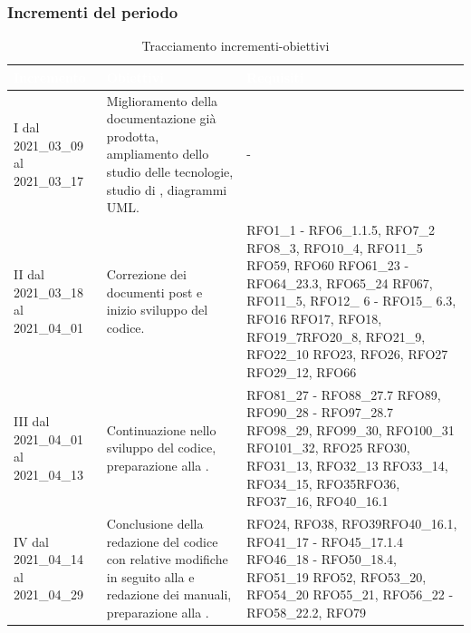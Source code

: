 \subsubsection{Incrementi del periodo}\label{IncrementiPDettaglio}
\begin{table}[H]
	\begin{center}
		\begin{tabular}{ |C{3cm} C{6cm} C{7cm}| }
			\textcolor{white}{\textbf{Incremento}} & \textcolor{white}{\textbf{Obiettivi}} & \textcolor{white}{\textbf{Requisiti}} \\ \hline
			I dal 2021\_03\_09 al 2021\_03\_17& Miglioramento della documentazione già prodotta, ampliamento dello studio delle tecnologie, studio di , diagrammi UML.  & - \\ \hline
			II dal 2021\_03\_18 al 2021\_04\_01 	& Correzione dei documenti post  e inizio sviluppo del codice. &  
			RFO1\_1 - RFO6\_1.1.5, RFO7\_2 \newline
			RFO8\_3, RFO10\_4, RFO11\_5 \newline
			RFO59, RFO60 \newline
			RFO61\_23 - RFO64\_23.3, RFO65\_24 \newline
			RF067,  RFO11\_5, \newline 
			RFO12\_ 6 - RFO15\_ 6.3, RFO16 \newline RFO17, RFO18, RFO19\_7\newline RFO20\_8, RFO21\_9, RFO22\_10 \newline RFO23, RFO26, RFO27 \newline RFO29\_12, RFO66\\ \hline
			III dal 2021\_04\_01 al 2021\_04\_13	& Continuazione nello sviluppo del codice, preparazione alla . & RFO81\_27 - RFO88\_27.7 \newline
			RFO89, RFO90\_28 - RFO97\_28.7 \newline
			RFO98\_29, RFO99\_30, RFO100\_31 \newline
			RFO101\_32, RFO25 \newline RFO30, RFO31\_13, RFO32\_13 \newline RFO33\_14, RFO34\_15, RFO35\newline  RFO36, RFO37\_16, RFO40\_16.1 \\ \hline
			IV dal 2021\_04\_14 al 2021\_04\_29 	& 
			Conclusione della redazione del codice con relative modifiche in seguito alla  e redazione dei manuali, preparazione alla . & RFO24, RFO38, RFO39\newline RFO40\_16.1,
			RFO41\_17 - RFO45\_17.1.4\newline
			RFO46\_18 - RFO50\_18.4, RFO51\_19 \newline
			RFO52, RFO53\_20, RFO54\_20 \newline
			RFO55\_21, RFO56\_22 - RFO58\_22.2, 
			RFO79\\ \hline
		\end{tabular}
		\caption{Tracciamento incrementi-obiettivi}
	\end{center}
\end{table}

